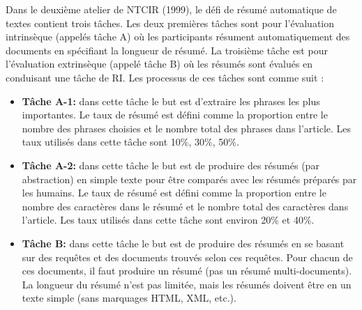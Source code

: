 \documentclass[a4paper,12pt,oneside]{../use/ESIthesis}
\begin{document}
Dans le deuxième atelier de NTCIR (1999), le défi de résumé automatique de textes contient trois tâches. 
Les deux premières tâches sont pour l'évaluation intrinsèque (appelés tâche A) où les participants résument automatiquement des documents en spécifiant la longueur de résumé. 
La troisième tâche est pour l'évaluation extrinsèque (appelé tâche B) où les résumés sont évalués en conduisant une tâche de RI. 
Les processus de ces tâches sont comme suit \cite{01-fukusima-okumura}:
\begin{itemize}
\item \textbf{Tâche A-1:} dans cette tâche le but est d'extraire les phrases les plus importantes. 
Le taux de résumé est défini comme la proportion entre le nombre des phrases choisies et le nombre total des phrases dans l'article. 
Les taux utilisés dans cette tâche sont 10\%, 30\%, 50\%.

\item \textbf{Tâche A-2:} dans cette tâche le but est de produire des résumés (par abstraction) en simple texte pour être comparés avec les résumés préparés par les humains. 
Le taux de résumé est défini comme la proportion entre le nombre des caractères dans le résumé et le nombre total des caractères dans l'article. 
Les taux utilisés dans cette tâche sont environ 20\% et 40\%. 

\item \textbf{Tâche B:} dans cette tâche le but est de produire des résumés en se basant sur des requêtes et des documents trouvés selon ces requêtes. 
Pour chacun de ces documents, il faut produire un résumé (pas un résumé multi-documents). 
La longueur du résumé n'est pas limitée, mais les résumés doivent être en un texte simple (sans marquages HTML, XML, etc.). 
\end{itemize}
\end{document}
